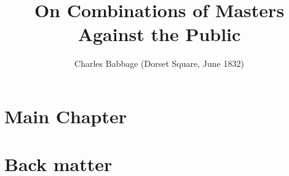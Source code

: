 \documentclass[11pt]{book}
\title{On Combinations of Masters Against the Public}
\author{Charles Babbage (Dorset Square, June 1832)}
\begin{document}
\maketitle
\def\title#1{\chapter{#1}}
\tableofcontents

\part{Main Chapter}
        
        
        
        
\part{Back matter}
        
        
        
        
\end{document}
